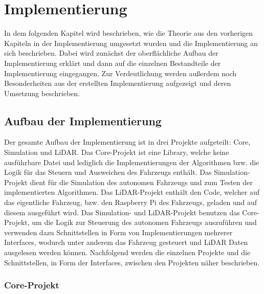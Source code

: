 \section{Implementierung}

In dem folgenden Kapitel wird beschrieben, wie die Theorie aus den vorherigen Kapiteln in der Implementierung umgesetzt wurden und die Implementierung an sich beschrieben. Dabei wird zunächst der oberflächliche Aufbau der Implementierung erklärt und dann auf die einzelnen Bestandteile der Implementierung eingegangen. Zur Verdeutlichung werden außerdem noch Besonderheiten aus der erstellten Implementierung aufgezeigt und deren Umsetzung beschrieben. 

\subsection{Aufbau der Implementierung}

Der gesamte Aufbau der Implementierung ist in drei Projekte aufgeteilt: Core, Simulation und LiDAR. Das Core-Projekt ist eine Library, welche keine ausführbare Datei und lediglich die Implementierungen der Algorithmen bzw. die Logik für das Steuern und Ausweichen des Fahrzeugs enthält. Das Simulation-Projekt dient für die Simulation des autonomen Fahrzeugs und zum Testen der implementierten Algorithmen. Das LiDAR-Projekt enthält den Code, welcher auf das eigentliche Fahrzeug, bzw. den Raspberry Pi des Fahrzeugs, geladen und auf diesem ausgeführt wird. Das Simulation- und LiDAR-Projekt benutzen das Core-Projekt, um die Logik zur Steuerung des autonomen Fahrzeugs auszuführen und verwenden dazu Schnittstellen in Form von Implementierungen mehrerer Interfaces, wodurch unter anderem das Fahrzeug gesteuert und LiDAR Daten ausgelesen werden können. Nachfolgend werden die einzelnen Projekte und die Schnittstellen, in Form der Interfaces, zwischen den Projekten näher beschrieben. 

\subsubsection{Core-Projekt}

